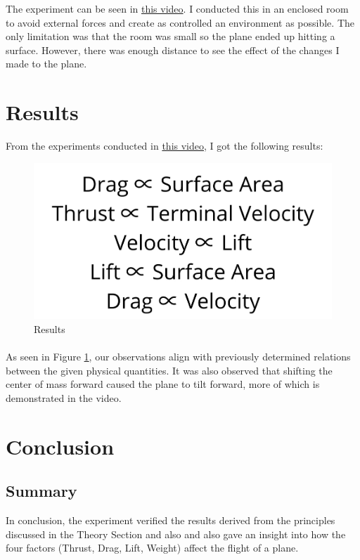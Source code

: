 \documentclass[12pt]{article}
\begin{document}
The experiment can be seen in \href{https://youtu.be/qcbdRIKSDts}{this video}. I conducted this in an enclosed room to avoid external forces and create as controlled an environment as possible. The only limitation was that the room was small so the plane ended up hitting a surface. However, there was enough distance to see the effect of the changes I made to the plane.
\section{Results}
From the experiments conducted in \href{https://youtu.be/qcbdRIKSDts}{this video}, I got the following results:
\begin{figure}[h!]
	\begin{center}
		\includegraphics[scale=0.4]{conclusions}
	\end{center}
	\caption{Results}
	\label{fig:results}
\end{figure}
\paragraph{}
As seen in Figure \ref{fig:results}, our observations align with previously determined relations between the given physical quantities. It was also observed that shifting the center of mass forward caused the plane to tilt forward, more of which is demonstrated in the video.
\section{Conclusion}
\subsection{Summary}
In conclusion, the experiment verified the results derived from the principles discussed in the Theory Section and also and also gave an insight into how the four factors (Thrust, Drag, Lift, Weight) affect the flight of a plane.
\end{document}

